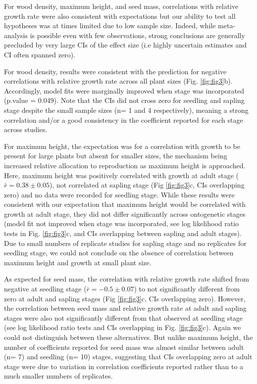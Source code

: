 \documentclass[a4paper,11pt]{article}
\begin{document}
For wood density, maximum height, and seed mass, correlations with relative growth rate were also consistent with expectations but our ability to test all hypotheses was at times limited due to low sample size. Indeed, while meta-analysis is possible even with few observations, strong conclusions are generally precluded by very large CIs of the effect size (i.e highly uncertain estimates and CI often spanned zero).

For wood density, results were consistent with the prediction for negative correlations with relative growth rate across all plant sizes (Fig. \ref{fig:fig3}b). Accordingly, model fits were marginally improved when stage was incorporated (p.value = 0.049). Note that the CIs did not cross zero for seedling and sapling stage despite the small sample sizes (n= 1 and 4 respectively), meaning a strong correlation and/or a good consistency in the coefficient reported for each stage across studies.

For maximum height, the expectation was for a correlation with growth to be present for large plants but absent for smaller sizes, the mechanism being increased relative allocation to reproduction as maximum height is approached. Here, maximum height was positively correlated with growth at adult stage ($\bar{r}= 0.38 \pm 0.05$), not correlated at sapling stage (Fig \ref{fig:fig3}c, CIs overlapping zero) and no data were recorded for seedling stage.
While these results were consistent with our expectation that maximum height would be correlated with growth at adult stage, they did not differ significantly across ontogenetic stages (model fit not improved when stage was incorporated, see log likelihood ratio tests in Fig. \ref{fig:fig3}c, and CIs overlapping between sapling and adult stages). Due to small numbers of replicate studies for sapling stage and no replicates for seedling stage, we could not conclude on the absence of correlation between maximum height and growth at small plant size.

As expected for seed mass, the correlation with relative growth rate shifted from negative at seedling stage ($\bar{r}= -0.5 \pm 0.07$) to not significantly different from zero at adult and sapling stages (Fig \ref{fig:fig3}c, CIs overlapping zero). However, the correlation between seed mass and relative growth rate at adult and sapling stages were also not significantly different from that observed at seedling stage (see log likelihood ratio tests and CIs overlapping in Fig. \ref{fig:fig3}c). Again we could not distinguish between these alternatives. But unlike maximum height, the number of coefficients reported for seed mass was almost similar between adult (n= 7) and seedling (n= 10) stages, suggesting that CIs overlapping zero at adult stage were due to variation in correlation coefficients reported rather than to a much smaller numbers of replicates.
\end{document}
